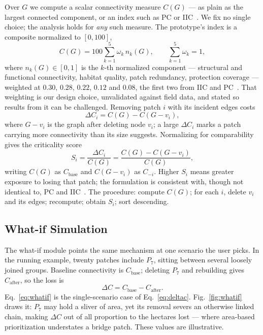 \documentclass[conference]{IEEEtran}
\begin{document}
Over $G$ we compute a scalar connectivity measure $C(G)$ --- as plain as the largest connected component, or an index such as PC or IIC~\cite{pascualhortal2006comparison,saura2007habitat}. We fix no single choice; the analysis holds for \emph{any} such measure. The prototype's index is a composite normalized to $[0,100]$,
\begin{equation}
C(G) = 100 \sum_{k=1}^{5} \omega_k \, n_k(G), \qquad \sum_{k=1}^{5} \omega_k = 1,
\label{eq:composite}
\end{equation}
where $n_k(G) \in [0,1]$ is the $k$-th normalized component --- structural and functional connectivity, habitat quality, patch redundancy, protection coverage --- weighted at $0.30$, $0.28$, $0.22$, $0.12$ and $0.08$, the first two from IIC and PC~\cite{pascualhortal2006comparison,saura2007habitat}. That weighting is our design choice, unvalidated against field data, and stated so results from it can be challenged. Removing patch $i$ with its incident edges costs
\begin{equation}
\Delta C_i = C(G) - C(G - v_i),
\label{eq:deltac}
\end{equation}
where $G - v_i$ is the graph after deleting node $v_i$; a large $\Delta C_i$ marks a patch carrying more connectivity than its size suggests. Normalizing for comparability gives the criticality score
\begin{equation}
S_i = \frac{\Delta C_i}{C(G)} = \frac{C(G) - C(G-v_i)}{C(G)},
\label{eq:criticality}
\end{equation}
writing $C(G)$ as $C_{\text{base}}$ and $C(G - v_i)$ as $C_{-i}$. Higher $S_i$ means greater exposure to losing that patch; the formulation is consistent with, though not identical to, PC and IIC~\cite{pascualhortal2006comparison,saura2007habitat}. The procedure: compute $C(G)$; for each $i$, delete $v_i$ and its edges; recompute; obtain $S_i$; sort descending.

\subsection{What-if Simulation}

The what-if module points the same mechanism at one scenario the user picks. In the running example, twenty patches include $P_7$, sitting between several loosely joined groups. Baseline connectivity is $C_{\text{base}}$; deleting $P_7$ and rebuilding gives $C_{\text{after}}$, so the loss is
\begin{equation}
\Delta C = C_{\text{base}} - C_{\text{after}}.
\label{eq:whatif}
\end{equation}
Eq.~\eqref{eq:whatif} is the single-scenario case of Eq.~\eqref{eq:deltac}. Fig.~\ref{fig:whatif} draws it: $P_7$ may hold a sliver of area, yet its removal severs an otherwise linked chain, making $\Delta C$ out of all proportion to the hectares lost --- where area-based prioritization understates a bridge patch. These values are illustrative.
\end{document}
